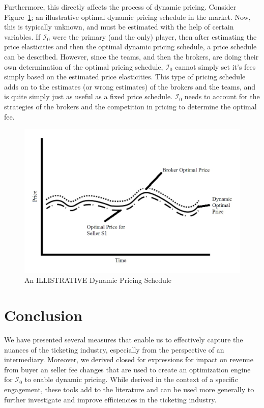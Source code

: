 \documentclass[letterpaper, 12pt]{article}
\begin{document}
Furthermore, this directly affects the process of dynamic pricing. Consider Figure~\ref{fig:idp}; an illustrative optimal dynamic pricing schedule in the market. Now, this is typically unknown, and must be estimated with the help of certain variables. If $\mathcal{I}_0$ were the primary (and the only) player, then after estimating the price elasticities and then the optimal dynamic pricing schedule, a price schedule can be described. However, since the teams, and then the brokers, are doing their own determination of the optimal pricing schedule, $\mathcal{I}_0$ cannot simply set it's fees simply based on the estimated price elasticities. This type of pricing schedule adds on to the estimates (or wrong estimates) of the brokers and the teams, and is quite simply just as useful as a fixed price schedule. $\mathcal{I}_0$ needs to account for the strategies of the brokers and the competition in pricing to determine the optimal fee. 
\begin{figure}[h]
	\centering
	\includegraphics[scale=.3]{IMG_20151201_104645518.jpg}
	\caption{An ILLISTRATIVE Dynamic Pricing Schedule}
	\label{fig:idp}
\end{figure}





\section{Conclusion}
We have presented several measures that enable us to effectively capture the nuances of the ticketing industry, especially from the perspective of an intermediary. Moreover, we derived closed for expressions for impact on revenue from buyer an seller fee changes that are used to create an optimization engine for $\mathcal{I}_0$ to enable dynamic pricing. While derived in the context of a specific engagement, these tools add to the literature and can be used more generally to further investigate and improve efficiencies in the ticketing industry.



\end{document}
